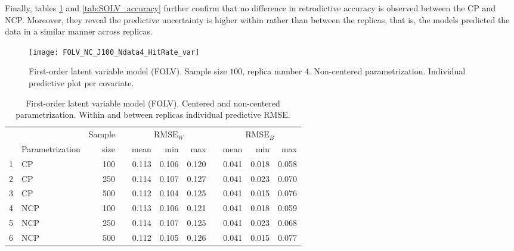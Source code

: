 Finally, tables \ref{tab:FOLV_accuracy} and \ref{tab:SOLV_accuracy} further confirm that no difference in retrodictive accuracy is observed between the CP and NCP. Moreover, they reveal the predictive uncertainty is higher within rather than between the replicas, that is, the models predicted the data in a similar manner across replicas.
%
\begin{figure}[H]
	\centering
	\texttt{[image: FOLV\_NC\_J100\_Ndata4\_HitRate\_var]}
	\caption[First-order latent variable model (FOLV). Sample size $100$, replica number $4$. Non-centered parametrization. Individual predictive plot per covariate.]%
	{First-order latent variable model (FOLV). Sample size $100$, replica number $4$. Non-centered parametrization. Individual predictive plot per covariate.}
	\label{fig:FOLV_NC_hitrate_var}
\end{figure}
%
\begin{table}[H]
	\centering
	\begin{tabular}{rlrrrrrrrrr}
		\hline
		& & Sample && \multicolumn{3}{c}{ $\overline{\text{RMSE}}_{W}$ } && \multicolumn{3}{c}{ $\text{RMSE}_{B}$ } \\
		\cmidrule(rl){5-7} \cmidrule(rl){9-11}  
		& Parametrization & size  && mean & min & max && mean & min & max \\ 
		\hline\hline
		1 & CP & 100 && 0.113 & 0.106 & 0.120 && 0.041 & 0.018 & 0.058 \\ 
		2 & CP & 250 && 0.114 & 0.107 & 0.127 && 0.041 & 0.023 & 0.070 \\
		3 & CP & 500 && 0.112 & 0.104 & 0.125 && 0.041 & 0.015 & 0.076 \\
		\hline
		4 & NCP & 100 && 0.113 & 0.106 & 0.121 && 0.041 & 0.018 & 0.059 \\ 
		5 & NCP & 250 && 0.114 & 0.107 & 0.125 && 0.041 & 0.023 & 0.068 \\ 
		6 & NCP & 500 && 0.112 & 0.105 & 0.126 && 0.041 & 0.015 & 0.077 \\
		\hline
	\end{tabular}
	\caption[First-order latent variable model (FOLV). Centered and non-centered parametrization. Within and between replicas individual predictive RMSE.]%
	{First-order latent variable model (FOLV). Centered and non-centered parametrization. Within and between replicas individual predictive RMSE.}
	\label{tab:FOLV_accuracy}
\end{table}
%
